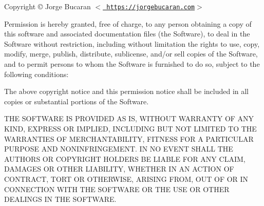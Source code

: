 Copyright © Jorge Bucaran \texorpdfstring{$<$}{<}\href{https://jorgebucaran.com}{\texttt{ https\+://jorgebucaran.\+com}}\texorpdfstring{$>$}{>}

Permission is hereby granted, free of charge, to any person obtaining a copy of this software and associated documentation files (the \textquotesingle{}Software\textquotesingle{}), to deal in the Software without restriction, including without limitation the rights to use, copy, modify, merge, publish, distribute, sublicense, and/or sell copies of the Software, and to permit persons to whom the Software is furnished to do so, subject to the following conditions\+:

The above copyright notice and this permission notice shall be included in all copies or substantial portions of the Software.

THE SOFTWARE IS PROVIDED \textquotesingle{}AS IS\textquotesingle{}, WITHOUT WARRANTY OF ANY KIND, EXPRESS OR IMPLIED, INCLUDING BUT NOT LIMITED TO THE WARRANTIES OF MERCHANTABILITY, FITNESS FOR A PARTICULAR PURPOSE AND NONINFRINGEMENT. IN NO EVENT SHALL THE AUTHORS OR COPYRIGHT HOLDERS BE LIABLE FOR ANY CLAIM, DAMAGES OR OTHER LIABILITY, WHETHER IN AN ACTION OF CONTRACT, TORT OR OTHERWISE, ARISING FROM, OUT OF OR IN CONNECTION WITH THE SOFTWARE OR THE USE OR OTHER DEALINGS IN THE SOFTWARE. 